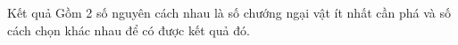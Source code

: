 Kết quả
Gồm 2 số nguyên cách nhau là số chướng ngại vật ít nhất cần phá và số cách chọn khác nhau để có được kết quả đó.